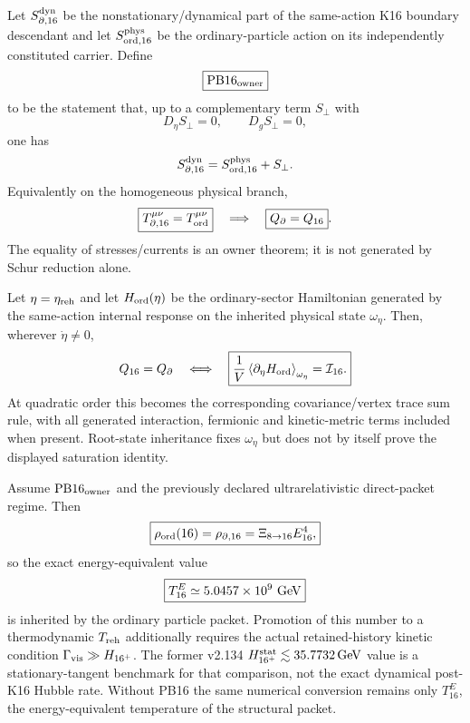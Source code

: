 \documentclass[12pt,a4paper]{article}
\begin{document}
\begin{definition}
\label{p8:def:v2135-pb16-owner}
Let $S_{\partial,16}^{\rm dyn}$ be the nonstationary/dynamical part of the
same-action K16 boundary descendant and let $S_{\rm ord,16}^{\rm phys}$ be the
ordinary-particle action on its independently constituted carrier.  Define
\[
 \boxed{\mathrm{PB16}_{\rm owner}}
\]
to be the statement that, up to a complementary term $S_\perp$ with
\[
 D_\eta S_\perp=0,
 \qquad
 D_gS_\perp=0,
\]
one has
\[
 S_{\partial,16}^{\rm dyn}=S_{\rm ord,16}^{\rm phys}+S_\perp.
\]
Equivalently on the homogeneous physical branch,
\[
 \boxed{
 T_{\partial,16}^{\mu\nu}=T_{\rm ord}^{\mu\nu}}
 \quad\Longrightarrow\quad
 \boxed{Q_\partial=Q_{16}}.
\]
The equality of stresses/currents is an owner theorem; it is not generated by
Schur reduction alone.
\end{definition}

\begin{proposition}
\label{p8:prop:v2135-k16-saturation-criterion}
Let $\eta=\eta_{\rm reh}$ and let $H_{\rm ord}(\eta)$ be the ordinary-sector
Hamiltonian generated by the same-action internal response on the inherited
physical state $\omega_\eta$.  Then, wherever $\dot\eta\ne0$,
\[
 Q_{16}=Q_\partial
 \quad\Longleftrightarrow\quad
 \boxed{
 \frac1V\left\langle\partial_\eta H_{\rm ord}\right\rangle_{\omega_\eta}
 =\mathcal I_{16}.}
\]
At quadratic order this becomes the corresponding covariance/vertex trace
sum rule, with all generated interaction, fermionic and kinetic-metric terms
included when present.  Root-state inheritance fixes $\omega_\eta$ but does
not by itself prove the displayed saturation identity.
\end{proposition}

\begin{corollary}
\label{p8:cor:v2135-ordinary-normalization-pb16}
Assume $\mathrm{PB16}_{\rm owner}$ and the previously declared
ultrarelativistic direct-packet regime.  Then
\[
 \boxed{
 \rho_{\rm ord}(16)
 =\rho_{\partial,16}
 =\Xi_{8\to16}E_{16}^4,}
\]
so the exact energy-equivalent value
\[
 \boxed{T_{16}^{E}\simeq5.0457\times10^9\ {\rm GeV}}
\]
is inherited by the ordinary particle packet.  Promotion of this number to a
thermodynamic $T_{\rm reh}$ additionally requires the actual retained-history
kinetic condition $\Gamma_{\rm vis}\gg H_{16^+}$.  The former v2.134
$H_{16^+}^{\rm stat}\lesssim35.7732\,{\rm GeV}$ value is a stationary-tangent
benchmark for that comparison, not the exact dynamical post-K16 Hubble rate.
Without PB16 the same numerical conversion remains only $T_{16}^{E}$, the
energy-equivalent temperature of the structural packet.
\end{corollary}
\end{document}
